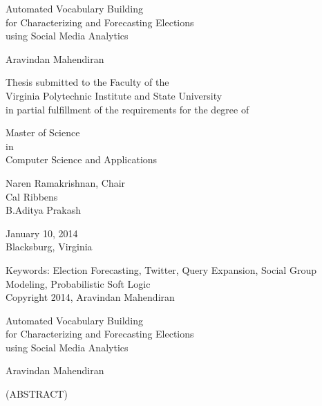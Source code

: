 \documentclass[12pt]{report}
\begin{document}
\thispagestyle{empty}
\begin{center}

{\Large 
Automated Vocabulary Building\\
for Characterizing and Forecasting Elections\\
using Social Media Analytics
}

\vfill

Aravindan Mahendiran

\vfill

Thesis submitted to the Faculty of the \\
Virginia Polytechnic Institute and State University \\
in partial fulfillment of the requirements for the degree of

\vfill

Master of Science \\
in \\
Computer Science and Applications

\vfill

Naren Ramakrishnan, Chair \\
Cal Ribbens \\
B.Aditya Prakash

\vfill

January 10, 2014 \\
Blacksburg, Virginia

\vfill

Keywords: Election Forecasting, Twitter, Query Expansion, Social Group Modeling, Probabilistic Soft Logic \\
Copyright 2014, Aravindan Mahendiran

\end{center}

\pagebreak

\thispagestyle{empty}
\begin{center}

{\large Automated Vocabulary Building\\
for Characterizing and Forecasting Elections\\
using Social Media Analytics}

\vfill

Aravindan Mahendiran

\vfill

(ABSTRACT)

\vfill

\end{center}
\end{document}
